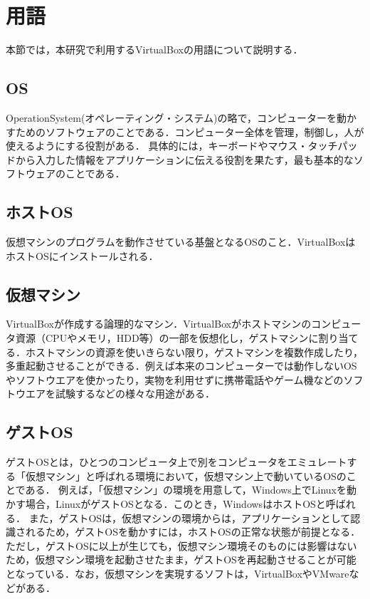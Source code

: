 \section{用語}
本節では，本研究で利用するVirtualBoxの用語について説明する．


\subsection{OS}
OperationSystem(オペレーティング・システム)の略で，コンピューターを動かすためのソフトウェアのことである．コンピューター全体を管理，制御し，人が使えるようにする役割がある．
具体的には，キーボードやマウス・タッチパッドから入力した情報をアプリケーションに伝える役割を果たす，最も基本的なソフトウェアのことである．

\subsection{ホストOS}
仮想マシンのプログラムを動作させている基盤となるOSのこと．VirtualBoxはホストOSにインストールされる．

\subsection{仮想マシン}
VirtualBoxが作成する論理的なマシン．VirtualBoxがホストマシンのコンピュータ資源（CPUやメモリ，HDD等）の一部を仮想化し，ゲストマシンに割り当てる．ホストマシンの資源を使いきらない限り，ゲストマシンを複数作成したり，多重起動させることができる．例えば本来のコンピューターでは動作しないOSやソフトウエアを使かったり，実物を利用せずに携帯電話やゲーム機などのソフトウエアを試験するなどの様々な用途がある．

\subsection{ゲストOS}

ゲストOSとは，ひとつのコンピュータ上で別をコンピュータをエミュレートする「仮想マシン」と呼ばれる環境において，仮想マシン上で動いているOSのことである．
例えば，「仮想マシン」の環境を用意して，Windows上でLinuxを動かす場合，LinuxがゲストOSとなる．このとき，WindowsはホストOSと呼ばれる．
また，ゲストOSは，仮想マシンの環境からは，アプリケーションとして認識されるため，ゲストOSを動かすには，ホストOSの正常な状態が前提となる．ただし，ゲストOSに以上が生じても，仮想マシン環境そのものには影響はないため，仮想マシン環境を起動させたまま，ゲストOSを再起動させることが可能となっている．なお，仮想マシンを実現するソフトは，VirtualBoxやVMwareなどがある．

